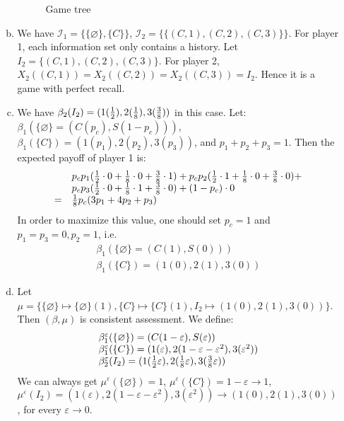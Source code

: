 \documentclass[a4paper,12pt]{article}
\begin{document}
\begin{enumerate}
\begin{enumerate}[(a)]
\begin{figure}[!htb]
{\begin{egame}
        \end{egame}
    }%
    \caption{Game tree}\label{fig:2}
    \end{figure}

\item
We have $\mathcal {I}_1=\{\{\varnothing\},\{C\}\}$, $\mathcal {I}_2=\{\{(C,1),(C,2),(C,3)\}\}$.
For player 1, each information set only contains a history.
Let $I_2=\{(C,1),(C,2),(C,3)\}$.
For player 2, $X_2((C,1))=X_2((C,2))=X_2((C,3))=I_2$.
Hence it is a game with perfect recall.

\item
We have $\beta_2(I_2)=(1({1\over 2}), 2({1\over 8}), 3({3\over 8}))$ in this case.
Let: \\$\beta_1(\{\varnothing\}=(C(p_c),S(1-p_c)))$, \\$\beta_1(\{C\})=(1(p_1),2(p_2),3(p_3))$, and $p_1+p_2+p_3=1$.
Then the expected payoff of player 1 is:
    \begin{displaymath}
    \begin{array}{ll}
    & p_c p_1 ({1\over 2}\cdot0+{1\over 8}\cdot0+{3\over 8}\cdot1)+
    p_c p_2 ({1\over 2}\cdot1+{1\over 8}\cdot0+{3\over 8}\cdot0)+\\
    & p_c p_3 ({1\over 2}\cdot0+{1\over 8}\cdot1+{3\over 8}\cdot0)+
    (1-p_c)\cdot0\\
    = & {1\over 8}p_c(3p_1+4p_2+p_3)
    \end{array}
    \end{displaymath}
In order to maximize this value, one should set $p_c=1$ and $p_1=p_3=0,p_2=1$, i.e.
    \begin{displaymath}
    \begin{array}{l}
    \beta_1(\{\varnothing\}=(C(1),S(0)))\\
    \beta_1(\{C\})=(1(0),2(1),3(0))
    \end{array}
    \end{displaymath}

\item
Let $\mu=\{\{\varnothing\}\mapsto\{\varnothing\}(1), \{C\}\mapsto\{C\}(1), I_2\mapsto(1(0),2(1),3(0))\}$.
Then $(\beta,\mu)$ is consistent assessment. We define:
    \begin{displaymath}
    \begin{array}{l}
    \beta_1^\varepsilon(\{\varnothing\})=(C(1-\varepsilon),S(\varepsilon))\\
    \beta_1^\varepsilon(\{C\})=(1(\varepsilon),2(1-\varepsilon-\varepsilon^2),3(\varepsilon^2))\\
    \beta_2^\varepsilon(I_2)=(1({1\over 2}\varepsilon),2({1\over 8}\varepsilon),3({3\over 8}\varepsilon))
    \end{array}
    \end{displaymath}
We can always get $\mu^\varepsilon(\{\varnothing\})=1$, $\mu^\varepsilon(\{C\})=1-\varepsilon \rightarrow 1$,\\
$\mu^\varepsilon(I_2)=(1(\varepsilon),2(1-\varepsilon-\varepsilon^2),3(\varepsilon^2)) \rightarrow (1(0),2(1),3(0))$,
for every $\varepsilon \rightarrow 0$.


\end{enumerate}
\end{enumerate}
\end{document}
